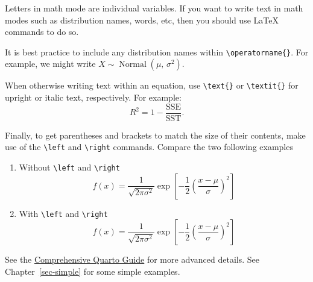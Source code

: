 \documentclass[
  11pt,
  letterpaper,
  twoside]{report}
\begin{document}
\begin{enumerate}
  \begin{tcolorbox}[enhanced jigsaw, coltitle=black, leftrule=.75mm, rightrule=.15mm, breakable, titlerule=0mm, bottomrule=.15mm, left=2mm, colbacktitle=quarto-callout-note-color!10!white, arc=.35mm, toprule=.15mm, title=\textcolor{quarto-callout-note-color}{\faInfo}\hspace{0.5em}{Note}, toptitle=1mm, colback=white, bottomtitle=1mm, opacitybacktitle=0.6, opacityback=0, colframe=quarto-callout-note-color-frame]

  Letters in math mode are individual variables. If you want to write
  text in math modes such as distribution names, words, etc, then you
  should use LaTeX commands to do so.

  It is best practice to include any distribution names within
  \texttt{\textbackslash{}operatorname\{\}}. For example, we might write
  \(X \sim \operatorname{Normal}(\mu,\, \sigma^2)\).

  When otherwise writing text within an equation, use
  \texttt{\textbackslash{}text\{\}} or
  \texttt{\textbackslash{}textit\{\}} for upright or italic text,
  respectively. For example: \[
  R^2 = 1 - \frac{\text{SSE}}{\text{SST}}.
  \]

  Finally, to get parentheses and brackets to match the size of their
  contents, make use of the \texttt{\textbackslash{}left} and
  \texttt{\textbackslash{}right} commands. Compare the two following
  examples

  \begin{enumerate}
  \def\labelenumii{\arabic{enumii}.}
  \item
    Without \texttt{\textbackslash{}left} and
    \texttt{\textbackslash{}right} \[
    f(x) = \frac{1}{\sqrt{2 \pi \sigma^2}} 
        \exp [-\frac{1}{2} (\frac{x - \mu}{\sigma})^2] 
    \]
  \item
    With \texttt{\textbackslash{}left} and
    \texttt{\textbackslash{}right} \[
    f(x) = \frac{1}{\sqrt{2 \pi \sigma^2}} 
        \exp \left[-\frac{1}{2} \left(\frac{x - \mu}{\sigma}\right)^2 \right] 
    \]
  \end{enumerate}

  \end{tcolorbox}
\end{enumerate}

See the \href{https://quarto.org/docs/guide/}{Comprehensive Quarto
Guide} for more advanced details. See Chapter~\ref{sec-simple} for some
simple examples.

\end{document}
